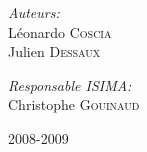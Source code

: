 \begin{titlepage}
	\vfill
	\begin{minipage}{0.5\textwidth}
		\begin{flushleft} \large
			\emph{Auteurs:}\\
			Léonardo \textsc{Coscia}\\
			Julien \textsc{Dessaux}
		\end{flushleft}
	\end{minipage}
	\begin{minipage}{0.45\textwidth}
		\begin{flushright} \large
		\emph{Responsable ISIMA:}\\
			Christophe \textsc{Gouinaud}%
		\end{flushright}
	\end{minipage}
	
	\vfil
	\begin{center}
		{\large 2008-2009}
	\end{center}
\end{titlepage}
